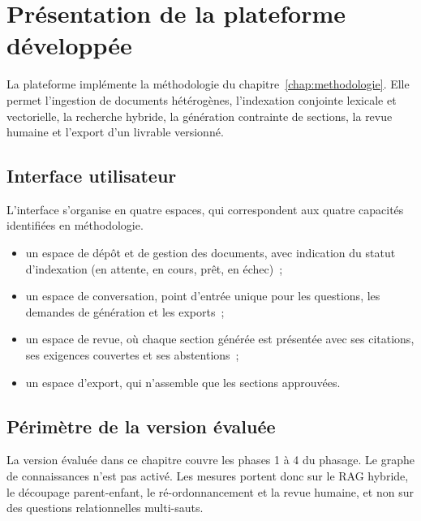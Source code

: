 \section{Présentation de la plateforme développée}
\label{sec:ch3-plateforme}

La plateforme implémente la méthodologie du chapitre~\ref{chap:methodologie}.
Elle permet l'ingestion de documents hétérogènes, l'indexation conjointe
lexicale et vectorielle, la recherche hybride, la génération contrainte
de sections, la revue humaine et l'export d'un livrable versionné.

\subsection{Interface utilisateur}

L'interface s'organise en quatre espaces, qui correspondent aux quatre
capacités identifiées en méthodologie.

\begin{itemize}
  \item un espace de dépôt et de gestion des documents, avec indication du
        statut d'indexation (en attente, en cours, prêt, en échec)~;
  \item un espace de conversation, point d'entrée unique pour les questions,
        les demandes de génération et les exports~;
  \item un espace de revue, où chaque section générée est présentée avec
        ses citations, ses exigences couvertes et ses abstentions~;
  \item un espace d'export, qui n'assemble que les sections approuvées.
\end{itemize}

\subsection{Périmètre de la version évaluée}

La version évaluée dans ce chapitre couvre les phases 1 à 4 du phasage.
Le graphe de connaissances n'est pas activé. Les mesures portent donc sur
le RAG hybride, le découpage parent-enfant, le ré-ordonnancement et la
revue humaine, et non sur des questions relationnelles multi-sauts.
